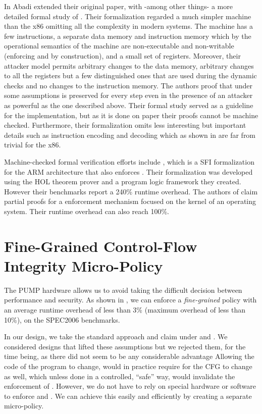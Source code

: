 In \cite{AbadiBEL09} Abadi \ETAL extended their original paper, with
-among other things- a more detailed formal study of \CFI. Their
formalization regarded a much simpler machine than the x86 omitting
all the complexity in modern systems. The machine has a few
instructions, a separate data memory and instruction memory which by
the operational semantics of the machine are non-executable and
non-writable (enforcing \NXD and \NWC by construction), and a small
set of registers.  Moreover, their attacker model permits arbitrary
changes to the data memory, arbitrary changes to all the registers but
a few distinguished ones that are used during the dynamic checks and
no changes to the instruction memory.  The authors proof that under
some assumptions \CFI is preserved for every step even in the presence
of an attacker as powerful as the one described above.  Their formal
study served as a guideline for the implementation, but as it is done
on paper their proofs cannot be machine checked. Furthermore, their
formalization omits less interesting but important details such as
instruction encoding and decoding which as shown in
\cite{MorrisettTTTG12} are far from trivial for the x86.

Machine-checked formal verification efforts include \cite{ZhaoLSR11},
which is a SFI formalization for the ARM architecture that also
enforces \CFI.  Their formalization was developed using the HOL
theorem prover and a program logic framework they created. However
their benchmarks report a 240\% runtime overhead. The authors of
\cite{CriswellDA14} claim partial proofs for a \CFI enforcement
mechanism focused on the kernel of an operating system. Their runtime
overhead can also reach 100\%.

\section{Fine-Grained Control-Flow Integrity Micro-Policy}\label{sec:cfi_fine}

The PUMP hardware allows us to avoid taking the difficult decision between
performance and security. As shown in \cite{pump_asplos2015}, we can enforce a
\emph{fine-grained} \CFI policy with an average runtime overhead of less than 3\%
(maximum overhead of less than 10\%), on the SPEC2006 benchmarks.

In our design, we take the standard approach and claim \CFI under \NXD and
\NWC{}.
We considered designs that lifted these assumptions but
we rejected them, for the time being, as there did not seem to be any
considerable advantage  Allowing the code of the program to change, would in
practice require for the CFG to change as well, which unless done in
a controlled, ``safe'' way, would invalidate the enforcement of \CFI.
However, we do not have to rely on special hardware or software to enforce
\NXD and \NWC. We can achieve this easily and efficiently by
creating a separate micro-policy.


